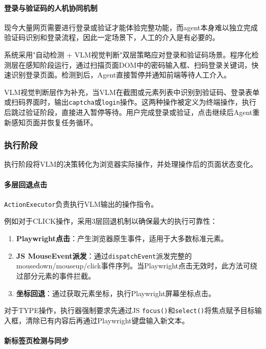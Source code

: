 \documentclass{SYSUReport}
\begin{document}
\paragraph{登录与验证码的人机协同机制}

现今大量网页需要进行登录或验证才能体验完整功能，而agent本身难以独立完成验证码识别和登录流程，因此一定场景下，人工的介入是有必要的。

系统采用"自动检测 + VLM视觉判断"双层策略应对登录和验证码场景。程序化检测层在感知阶段运行，通过扫描页面DOM中的密码输入框、扫码登录关键词，快速识别登录页面。检测到后，Agent直接暂停并通知前端等待人工介入。

VLM视觉判断层作为补充，当VLM在截图或元素列表中识别到验证码、登录表单或扫码界面时，输出\texttt{captcha}或\texttt{login}操作。这两种操作被定义为终端操作，执行后跳过验证阶段，直接进入暂停等待。用户完成登录或验证，点击继续后Agent重新感知页面并恢复任务循环。

\subsubsection{执行阶段}

执行阶段将VLM的决策转化为浏览器实际操作，并处理操作后的页面状态变化\cite{smartllm}。

\paragraph{多层回退点击}

\texttt{ActionExecutor}负责执行VLM输出的操作指令。

例如对于CLICK操作，采用3层回退机制以确保最大的执行可靠性：

\begin{enumerate}
    \item \textbf{Playwright点击}：产生浏览器原生事件，适用于大多数标准元素。
    \item \textbf{JS MouseEvent派发}：通过\texttt{dispatchEvent}派发完整的mousedown/mouseup/click事件序列。当Playwright点击无效时，此方法可绕过部分元素的事件拦截。
    \item \textbf{坐标回退}：通过获取元素坐标，执行Playwright屏幕坐标点击。
\end{enumerate}

对于TYPE操作，执行器强制要求先通过JS \texttt{focus()}和\texttt{select()}将焦点赋予目标输入框，清除已有内容后再通过Playwright键盘输入新文本。

\paragraph{新标签页检测与同步}
\end{document}
